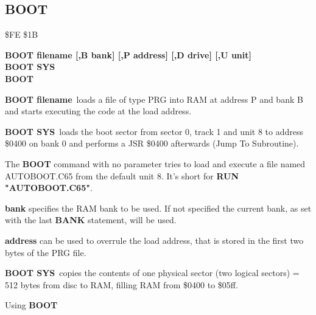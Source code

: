 \subsection{BOOT}
\begin{description}[leftmargin=3cm,style=nextline]
\item [Token:] \$FE \$1B
\item [Format:] {\bf BOOT filename [,B bank]
                [,P address]  [,D drive] [,U unit] } \\
                {\bf BOOT SYS} \\
                {\bf BOOT} 
\item [Usage:]
   {\bf BOOT filename} loads a file of type
   PRG into RAM at address P and bank B and starts executing
   the code at the load address.

   {\bf BOOT SYS} loads the boot sector from sector 0,
   track 1 and unit 8 to address \$0400 on bank 0 and
   performs a JSR \$0400 afterwards (Jump To Subroutine).

   The {\bf BOOT} command with no parameter tries to load
   and execute a file named AUTOBOOT.C65 from the default unit 8.
   It's short for {\bf RUN "AUTOBOOT.C65"}.

   \filenamedefinition

   {\bf bank} specifies the RAM bank to be used.
   If not specified the current bank, as set with the last
   {\bf BANK} statement, will be used.

   {\bf address} can be used to overrule the load address,
   that is stored in the first two bytes of the PRG file.

   \drivedefinition

   \unitdefinition

\item [Remarks:]
   {\bf BOOT SYS} copies the contents of one physical sector
   (two logical sectors) = 512 bytes from disc to RAM,
   filling RAM from \$0400 to \$05ff.

\item [Example:] Using {\bf BOOT}
\end{description}


\newpage
